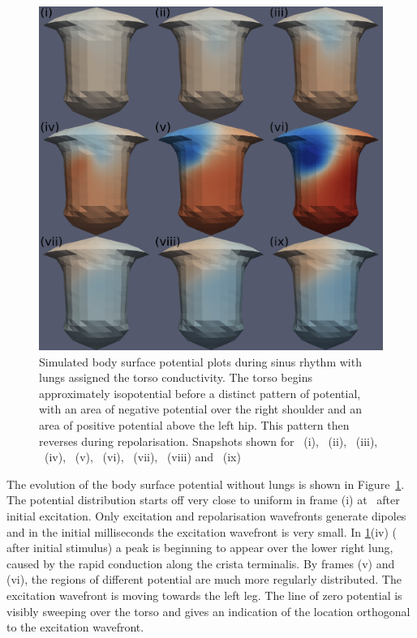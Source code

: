 \begin{figure}
\includegraphics{figures/bsp/bsp_no_lungs}
\caption[Body Surface Potential snapshots, without lungs]{
\label{bsp:fig:transp_lungs_bsp}
Simulated body surface potential plots during sinus rhythm with lungs assigned
the torso conductivity.
The torso begins approximately isopotential before a distinct pattern of
potential, with an area of negative potential over the right shoulder and an
area of positive potential above the left hip.
This pattern then reverses during repolarisation.
Snapshots shown for \ (i), \ (ii), \ (iii), \ (iv),
\ (v), \ (vi), \ (vii), \ (viii) and \
(ix)
}
\end{figure}

The evolution of the body surface potential without lungs is shown in
Figure~\ref{bsp:fig:transp_lungs_bsp}.
The potential distribution starts off very close to uniform in frame (i) at
\ms{10}\ after initial excitation.
Only excitation and repolarisation wavefronts generate dipoles and in the
initial milliseconds the excitation wavefront is very small.
In \ref{bsp:fig:transp_lungs_bsp}(iv) ( after initial stimulus) a peak is
beginning to appear over the lower right lung, caused by the rapid conduction
along the crista terminalis.
By frames (v) and (vi), the regions of different potential are much more
regularly distributed.
The excitation wavefront is moving towards the left leg.
The line of zero potential is visibly sweeping over the torso and gives an
indication of the location orthogonal to the excitation wavefront.

